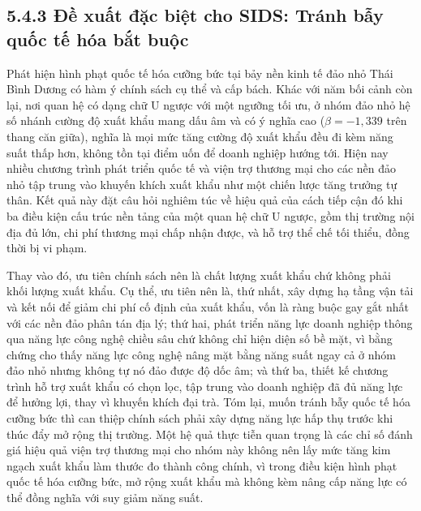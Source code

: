 \documentclass[
  a4paper,
  13pt]{extreport}
\begin{document}
\hypertarget{ux111ux1ec1-xuux1ea5t-ux111ux1eb7c-biux1ec7t-cho-sids-truxe1nh-bux1eaby-quux1ed1c-tux1ebf-huxf3a-bux1eaft-buux1ed9c}{%
\subsection{5.4.3 Đề xuất đặc biệt cho SIDS: Tránh bẫy quốc tế hóa bắt
buộc}\label{ux111ux1ec1-xuux1ea5t-ux111ux1eb7c-biux1ec7t-cho-sids-truxe1nh-bux1eaby-quux1ed1c-tux1ebf-huxf3a-bux1eaft-buux1ed9c}}

Phát hiện hình phạt quốc tế hóa cưỡng bức tại bảy nền kinh tế đảo nhỏ
Thái Bình Dương có hàm ý chính sách cụ thể và cấp bách. Khác với năm bối
cảnh còn lại, nơi quan hệ có dạng chữ U ngược với một ngưỡng tối ưu, ở
nhóm đảo nhỏ hệ số nhánh cường độ xuất khẩu mang dấu âm và có ý nghĩa
cao (\(\beta = -1{,}339\) trên thang căn giữa), nghĩa là mọi mức tăng
cường độ xuất khẩu đều đi kèm năng suất thấp hơn, không tồn tại điểm uốn
để doanh nghiệp hướng tới. Hiện nay nhiều chương trình phát triển quốc
tế và viện trợ thương mại cho các nền đảo nhỏ tập trung vào khuyến khích
xuất khẩu như một chiến lược tăng trưởng tự thân. Kết quả này đặt câu
hỏi nghiêm túc về hiệu quả của cách tiếp cận đó khi ba điều kiện cấu
trúc nền tảng của một quan hệ chữ U ngược, gồm thị trường nội địa đủ
lớn, chi phí thương mại chấp nhận được, và hỗ trợ thể chế tối thiểu,
đồng thời bị vi phạm.

Thay vào đó, ưu tiên chính sách nên là chất lượng xuất khẩu chứ không
phải khối lượng xuất khẩu. Cụ thể, ưu tiên nên là, thứ nhất, xây dựng hạ
tầng vận tải và kết nối để giảm chi phí cố định của xuất khẩu, vốn là
ràng buộc gay gắt nhất với các nền đảo phân tán địa lý; thứ hai, phát
triển năng lực doanh nghiệp thông qua năng lực công nghệ chiều sâu chứ
không chỉ hiện diện số bề mặt, vì bằng chứng cho thấy năng lực công nghệ
nâng mặt bằng năng suất ngay cả ở nhóm đảo nhỏ nhưng không tự nó đảo
được độ dốc âm; và thứ ba, thiết kế chương trình hỗ trợ xuất khẩu có
chọn lọc, tập trung vào doanh nghiệp đã đủ năng lực để hưởng lợi, thay
vì khuyến khích đại trà. Tóm lại, muốn tránh bẫy quốc tế hóa cưỡng bức
thì can thiệp chính sách phải xây dựng năng lực hấp thụ trước khi thúc
đẩy mở rộng thị trường. Một hệ quả thực tiễn quan trọng là các chỉ số
đánh giá hiệu quả viện trợ thương mại cho nhóm này không nên lấy mức
tăng kim ngạch xuất khẩu làm thước đo thành công chính, vì trong điều
kiện hình phạt quốc tế hóa cưỡng bức, mở rộng xuất khẩu mà không kèm
nâng cấp năng lực có thể đồng nghĩa với suy giảm năng suất.
\end{document}
